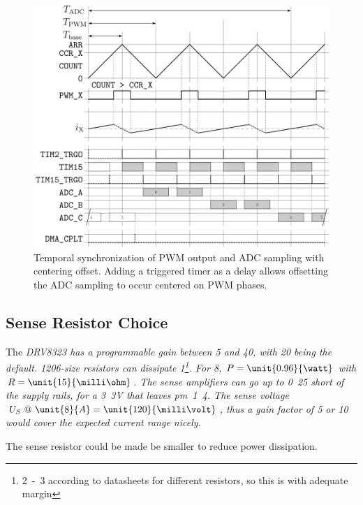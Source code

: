 \documentclass[12pt,a4paper,oneside,openany]{article}
\begin{document}
\begin{figure}[htbp]
\begin{center}
\includegraphics[scale=0.4]{n17-servo-pwm-adc-offset.pdf}
\caption[PWM and ADC Sync with Offset]{Temporal synchronization of PWM output and ADC sampling with centering offset. Adding a triggered timer as a delay allows offsetting the ADC sampling to occur centered on PWM phases.}
\label{fig:pwm-adc-offset}
\end{center}
\end{figure}

\subsection{Sense Resistor Choice}

The \em DRV8323 \em has a programmable gain between 5 and 40, with 20 being the default. 1206-size resistors can dissipate \unit{1}{\watt}\footnote{\unit{2-3}{\watt} according to datasheets for different resistors, so this is with adequate margin}. For \unit{8}{\ampere}, $P = \unit{0.96}{\watt}$ with $R=\unit{15}{\milli\ohm}$. The sense amplifiers can go up to \unit{0.25}{\volt} short of the supply rails, for a \unit{3.3V}{\volt} that leaves \unit{\pm 1.4}{\volt}. The sense voltage $U_S \ @ \  \unit{8}{A}=\unit{120}{\milli\volt}$, thus a gain factor of 5 or 10 would cover the expected current range nicely.

The sense resistor could be made be smaller to reduce power dissipation.

\end{document}
